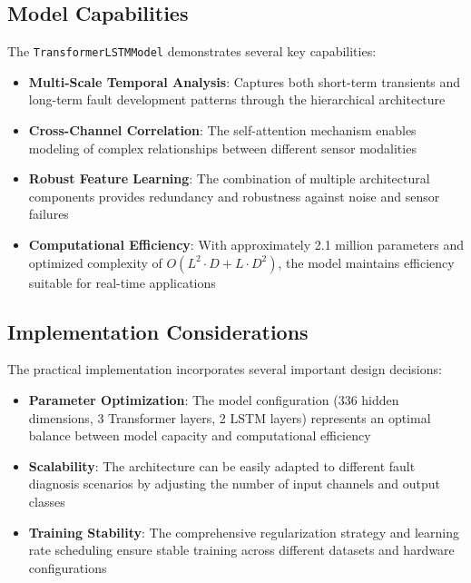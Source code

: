 \subsection{Model Capabilities}
\label{subsec:model_capabilities}

The \texttt{TransformerLSTMModel} demonstrates several key capabilities:

\begin{itemize}
    \item \textbf{Multi-Scale Temporal Analysis}: Captures both short-term transients and long-term fault development patterns through the hierarchical architecture
    \item \textbf{Cross-Channel Correlation}: The self-attention mechanism enables modeling of complex relationships between different sensor modalities
    \item \textbf{Robust Feature Learning}: The combination of multiple architectural components provides redundancy and robustness against noise and sensor failures
    \item \textbf{Computational Efficiency}: With approximately 2.1 million parameters and optimized complexity of $O(L^2 \cdot D + L \cdot D^2)$, the model maintains efficiency suitable for real-time applications
\end{itemize}

\subsection{Implementation Considerations}
\label{subsec:implementation_considerations}

The practical implementation incorporates several important design decisions:

\begin{itemize}
    \item \textbf{Parameter Optimization}: The model configuration (336 hidden dimensions, 3 Transformer layers, 2 LSTM layers) represents an optimal balance between model capacity and computational efficiency
    \item \textbf{Scalability}: The architecture can be easily adapted to different fault diagnosis scenarios by adjusting the number of input channels and output classes
    \item \textbf{Training Stability}: The comprehensive regularization strategy and learning rate scheduling ensure stable training across different datasets and hardware configurations
\end{itemize}

